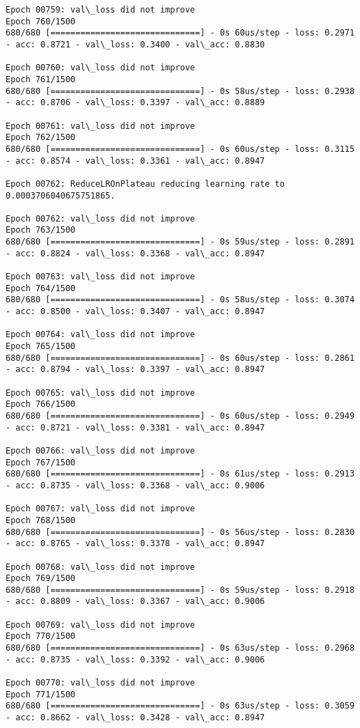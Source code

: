 \documentclass[11pt]{article}
\begin{document}
\begin{Verbatim}[commandchars=\\\{\}]
Epoch 00759: val\_loss did not improve
Epoch 760/1500
680/680 [==============================] - 0s 60us/step - loss: 0.2971 - acc: 0.8721 - val\_loss: 0.3400 - val\_acc: 0.8830

Epoch 00760: val\_loss did not improve
Epoch 761/1500
680/680 [==============================] - 0s 58us/step - loss: 0.2938 - acc: 0.8706 - val\_loss: 0.3397 - val\_acc: 0.8889

Epoch 00761: val\_loss did not improve
Epoch 762/1500
680/680 [==============================] - 0s 60us/step - loss: 0.3115 - acc: 0.8574 - val\_loss: 0.3361 - val\_acc: 0.8947

Epoch 00762: ReduceLROnPlateau reducing learning rate to 0.0003706040675751865.

Epoch 00762: val\_loss did not improve
Epoch 763/1500
680/680 [==============================] - 0s 59us/step - loss: 0.2891 - acc: 0.8824 - val\_loss: 0.3368 - val\_acc: 0.8947

Epoch 00763: val\_loss did not improve
Epoch 764/1500
680/680 [==============================] - 0s 58us/step - loss: 0.3074 - acc: 0.8500 - val\_loss: 0.3407 - val\_acc: 0.8947

Epoch 00764: val\_loss did not improve
Epoch 765/1500
680/680 [==============================] - 0s 60us/step - loss: 0.2861 - acc: 0.8794 - val\_loss: 0.3397 - val\_acc: 0.8947

Epoch 00765: val\_loss did not improve
Epoch 766/1500
680/680 [==============================] - 0s 60us/step - loss: 0.2949 - acc: 0.8721 - val\_loss: 0.3381 - val\_acc: 0.8947

Epoch 00766: val\_loss did not improve
Epoch 767/1500
680/680 [==============================] - 0s 61us/step - loss: 0.2913 - acc: 0.8735 - val\_loss: 0.3368 - val\_acc: 0.9006

Epoch 00767: val\_loss did not improve
Epoch 768/1500
680/680 [==============================] - 0s 56us/step - loss: 0.2830 - acc: 0.8765 - val\_loss: 0.3378 - val\_acc: 0.8947

Epoch 00768: val\_loss did not improve
Epoch 769/1500
680/680 [==============================] - 0s 59us/step - loss: 0.2918 - acc: 0.8809 - val\_loss: 0.3367 - val\_acc: 0.9006

Epoch 00769: val\_loss did not improve
Epoch 770/1500
680/680 [==============================] - 0s 63us/step - loss: 0.2968 - acc: 0.8735 - val\_loss: 0.3392 - val\_acc: 0.9006

Epoch 00770: val\_loss did not improve
Epoch 771/1500
680/680 [==============================] - 0s 63us/step - loss: 0.3059 - acc: 0.8662 - val\_loss: 0.3428 - val\_acc: 0.8947


\end{Verbatim}
\end{document}
